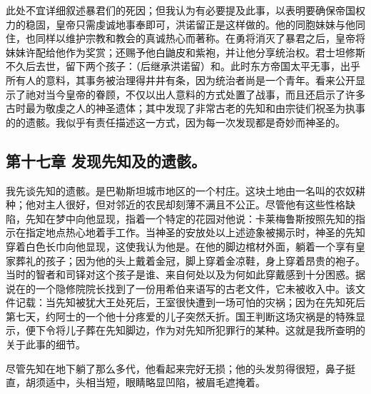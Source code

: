 此处不宜详细叙述暴君们的死因；但我认为有必要提及此事，以表明要确保帝国权力的稳固，皇帝只需虔诚地事奉即可，洪诺留正是这样做的。他的同胞妹妹与他同住，也同样以维护宗教和教会的真诚热心而著称。在勇将消灭了暴君之后，皇帝将妹妹许配给他作为奖赏；还赐予他白鼬皮和紫袍，并让他分享统治权。君士坦修斯不久后去世，留下两个孩子：（后继承洪诺留）和。此时东方帝国太平无事，出乎所有人的意料，其事务被治理得井井有条，因为统治者尚是一个青年。看来公开显示了祂对当今皇帝的眷顾，不仅以出人意料的方式处置了战事，而且还启示了许多古时最为敬虔之人的神圣遗体；其中发现了非常古老的先知和由宗徒们祝圣为执事的的遗骸。我似乎有责任描述这一方式，因为每一次发现都是奇妙而神圣的。\par


\subsection{第十七章 发现先知及的遗骸。}

我先谈先知的遗骸。是巴勒斯坦城市地区的一个村庄。这块土地由一名叫的农奴耕种；他对主人很好，但对邻近的农民却刻薄不满且不公正。尽管他有这些性格缺陷，先知在梦中向他显现，指着一个特定的花园对他说：卡莱梅鲁斯按照先知的指示在指定地点热心地着手工作。当神圣的安放处以上述迹象被揭示时，神圣的先知穿着白色长巾向他显现，这使我认为他是。在他的脚边棺材外面，躺着一个享有皇家葬礼的孩子；因为他的头上戴着金冠，脚上穿着金凉鞋，身上穿着昂贵的袍子。当时的智者和司铎对这个孩子是谁、来自何处以及为何如此穿戴感到十分困惑。据说在的一个隐修院院长找到了一份用希伯来语写的古老文件，它未被收入中。该文件记载：当先知被犹大王处死后，王室很快遭到一场可怕的灾祸；因为在先知死后第七天，约阿士的一个他十分疼爱的儿子突然夭折。国王判断这场灾祸是的特殊显示，便下令将儿子葬在先知脚边，作为对先知所犯罪行的某种。这就是我所查明的关于此事的细节。\par

尽管先知在地下躺了那么多代，他看起来完好无损；他的头发剪得很短，鼻子挺直，胡须适中，头相当短，眼睛略显凹陷，被眉毛遮掩着。\par

